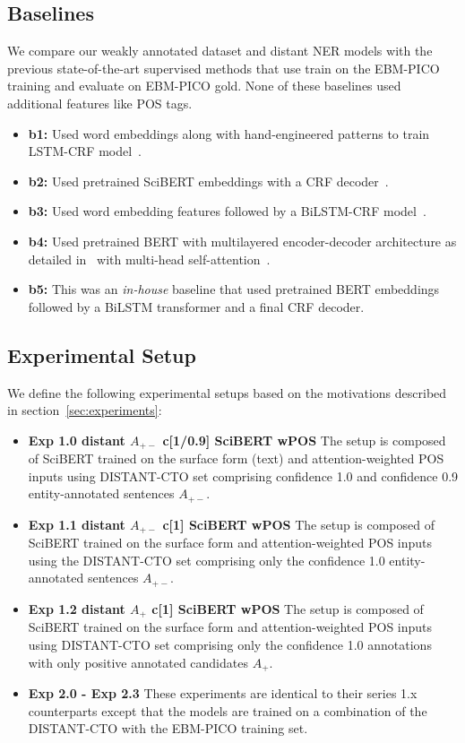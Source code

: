 \documentclass[letterpaper]{article} %
\begin{document}
\subsection{Baselines}
\label{subsec:base}
%
We compare our weakly annotated dataset and distant NER models with the previous state-of-the-art supervised methods that use train on the EBM-PICO training and evaluate on EBM-PICO gold.
None of these baselines used additional features like POS tags.
\begin{itemize}
    \item \textbf{b1:} Used word embeddings along with hand-engineered patterns to train LSTM-CRF model~\cite{nye2018corpus}. %
    \item \textbf{b2:} Used pretrained SciBERT embeddings with a CRF decoder~\cite{beltagy2019scibert}.
    \item \textbf{b3:} Used word embedding features followed by a BiLSTM-CRF model~\cite{brockmeier2019improving}.
    \item \textbf{b4:} Used pretrained BERT with multilayered encoder-decoder architecture as detailed in~\cite{vaswani2017attention} with multi-head self-attention~\cite{stylianou2021transformed}.
    \item \textbf{b5:} This was an \textit{in-house} baseline that used pretrained BERT embeddings followed by a BiLSTM transformer and a final CRF decoder.
\end{itemize}
%
\subsection{Experimental Setup}
\label{subsec:expsetup}
%
We define the following experimental setups based on the motivations described in section~\ref{sec:experiments}:
\begin{itemize}
    \item \textbf{Exp 1.0 distant $A_{+-}$ c[1/0.9] SciBERT wPOS} The setup is composed of SciBERT trained on the surface form (text) and attention-weighted POS inputs using DISTANT-CTO set comprising confidence 1.0 and confidence 0.9 entity-annotated sentences $A_{+-}$.
    \item \textbf{Exp 1.1 distant $A_{+-}$ c[1] SciBERT wPOS} The setup is composed of SciBERT trained on the surface form and attention-weighted POS inputs using the DISTANT-CTO set comprising only the confidence 1.0 entity-annotated sentences $A_{+-}$.
    \item \textbf{Exp 1.2 distant $A_{+}$ c[1] SciBERT wPOS} The setup is composed of SciBERT trained on the surface form and attention-weighted POS inputs using DISTANT-CTO set comprising only the confidence 1.0 annotations with only positive annotated candidates $A_{+}$.
    \item \textbf{Exp 2.0 - Exp 2.3 } These experiments are identical to their series 1.x counterparts except that the models are trained on a combination of the DISTANT-CTO with the EBM-PICO training set.
\end{itemize}
%
\end{document}

